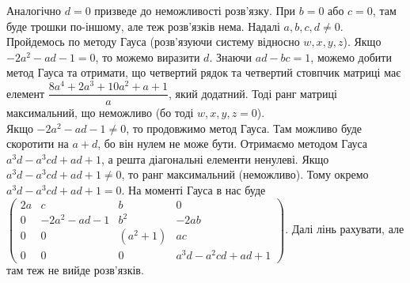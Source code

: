 \documentclass{math_library}
\begin{document}
\begin{remark}
Аналогічно $d = 0$ призведе до неможливості розв'язку. При $b = 0$ або $c = 0$, там буде трошки по-іншому, але теж розв'язків нема. Надалі $a,b,c,d \neq 0$.\\
Пройдемось по методу Гауса (розв'язуючи систему відносно $w,x,y,z$). Якщо $-2a^2 -ad - 1 = 0$, то можемо виразити $d$. Знаючи $ad - bc = 1$, можемо добити метод Гауса та отримати, що четвертий рядок та четвертий стовпчик матриці має елемент $\dfrac{8a^4+2a^3+10a^2+a+1}{a}$, який додатний. Тоді ранг матриці максимальний, що неможливо (бо тоді $w,x,y,z = 0$).\\
Якщо $-2a^2 - ad - 1 \neq 0$, то продовжимо метод Гауса. Там можливо буде скоротити на $a + d$, бо він нулем не може бути. Отримаємо методом Гауса $a^3d - a^3cd + ad + 1$, а решта діагональні елементи ненулеві. Якщо $a^3d - a^3cd + ad + 1 \neq 0$, то ранг максимальний (неможливо). Тому окремо $a^3d - a^3cd + ad + 1 = 0$. На моменті Гауса в нас буде $\begin{pmatrix}
2a & c & b & 0 \\
0 & -2a^2-ad-1 & b^2 & -2ab \\
0 & 0 & (a^2+1) & ac \\
0 & 0 & 0 & a^3d - a^2cd +ad +1
\end{pmatrix}$. Далі лінь рахувати, але там теж не вийде розв'язків.
\fi

\end{remark}
\end{document}
